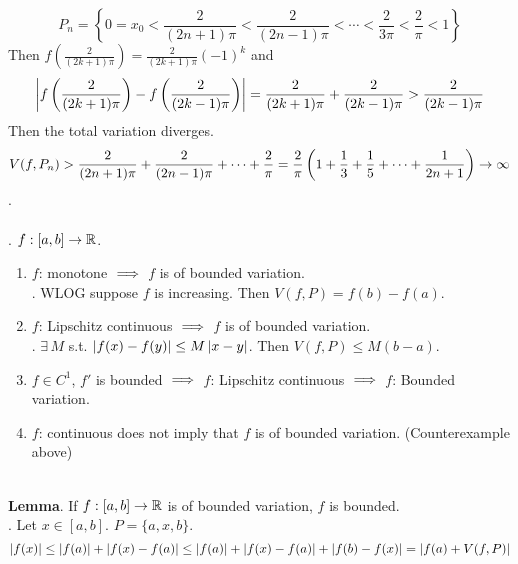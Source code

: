 $$P_n = \left\{0 = x_0 <\frac{2}{(2n+1)\pi} <\frac{2}{(2n-1)\pi} < \cdots < \frac{2}{3\pi} < \frac{2}{\pi} < 1 \right\}$$
Then $f(\frac{2}{(2k+1)\pi}) = \frac{2}{(2k+1)\pi} (-1)^k$ and $$\left|f\left(\frac{2}{(2k+1)\pi}\right) - f\left(\frac{2}{(2k-1)\pi}\right)\right| = \frac{2}{(2k+1)\pi} + \frac{2}{(2k-1)\pi} > \frac{2}{(2k-1)\pi}$$
Then the total variation diverges. $$V(f, P_n) > \frac{2}{(2n+1)\pi} + \frac{2}{(2n-1)\pi} + \cdots + \frac{2}{\pi} = \frac{2}{\pi} \left(1+\frac{1}{3} + \frac{1}{5} + \cdots + \frac{1}{2n+1}\right) \rightarrow \infty$$.\\
\\
\ex. $f:[a, b]\rightarrow\mathbb{R}$.
\begin{enumerate}
	\item $f$: monotone $\implies$ $f$ is of bounded variation.\\
	\pf. WLOG suppose $f$ is increasing. Then $V(f, P) = f(b)-f(a)$.
	\item $f$: Lipschitz continuous $\implies$ $f$ is of bounded variation.\\
	\pf. $\exists\, M$ s.t. $\left|f(x) - f(y)\right| \leq M\left|x-y\right|$. Then $V(f, P) \leq M(b-a)$.
	\item $f\in C^1$, $f'$ is bounded $\implies$ $f$: Lipschitz continuous $\implies $ $f$: Bounded variation.
	\item $f$: continuous does not imply that $f$ is of bounded variation. (Counterexample above)
\end{enumerate}~\\
\textbf{Lemma}. If $f:[a, b]\rightarrow\mathbb{R}$ is of bounded variation, $f$ is bounded.\\
\pf. Let $x\in[a, b]$. $P = \{a, x, b\}$.$$\left|f(x)\right| \leq \left|f(a)\right| + \left|f(x)-f(a)\right| \leq \left|f(a)\right| + \left|f(x) - f(a)\right| + \left|f(b)-f(x)\right| = \left|f(a) + V(f, P)\right|$$
\pagebreak